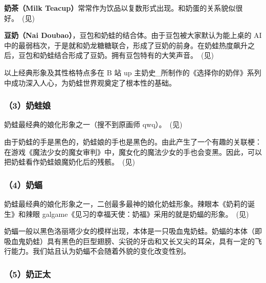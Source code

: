 \clearpage



\textbf{奶茶（Milk Teacup）}常常作为饮品以复数形式出现。和奶蛋的关系貌似很好。~(见)



\textbf{豆奶（Nai Doubao）}，豆包和奶蛙的结合体。由于豆包被大家默认为能上桌的 AI 中的最弱档次，于是就和奶龙糖糖联合，形成了豆奶的前身。在奶蛙热度飙升之后，豆包和奶蛙结合形成了豆奶。拥有豆包特有的大笑声音。~(见)

以上经典形象及其性格特点多在 B 站 up 主奶史\_所制作的《选择你的奶伴》系列中成功深入人心，为奶蛙世界观奠定了根本性的基础。

\subsubsection{（3）奶蛙娘}



奶蛙最经典的娘化形象之一（搜不到原画师 qwq）。~(见)

由于奶蛙的手是黑色的，奶蛙娘的手也是黑色的。由此产生了一个有趣的关联梗：在游戏《魔法少女的魔女审判》中，魔女化的魔法少女的手也会变黑。因此，可以把奶蛙看作奶蛙娘魔奶化后的残骸。~(见)

\clearpage


\subsubsection{（4）奶蝠}



奶蛙最经典的娘化形象之一，二创最多最神的娘化奶蛙形象。辣眼本《奶莉的诞生》和辣眼 galgame《见习的幸福天使：奶福》采用的就是奶蝠的形象。~(见)

奶蝠一般以黑色洛丽塔少女的模样出现，本体是一只吸血鬼奶蛙。奶蝠的本体（即吸血鬼奶蛙）具有黑色的巨型翅膀、尖锐的牙齿和又长又尖的耳朵，具有一定的飞行能力。我们姑且认为奶蝠不会随着外貌的变化改变性别。

\subsubsection{（5）奶正太}



